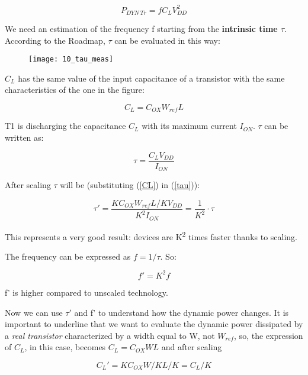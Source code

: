 \documentclass[a4paper, 12pt, twoside, openright]{report}
\newcommand{\super}{\textsuperscript}
\begin{document}
	\begin{equation}
	P_{DYN \ Tr} =f C_L V_{DD}^2
	\end{equation}

We need an estimation of the frequency f starting from the \textbf{intrinsic time $\tau$}. According to the Roadmap, $\tau$ can be evaluated in this way:

	\begin{figure}[H]
	\centering
	\texttt{[image: 10\_tau\_meas]}
	\caption{}
	\label{}
	\end{figure}

$C_{L}$ has the same value of the input capacitance of a transistor with the same characteristics of the one in the figure:

	\begin{equation}
	C_{L} = C_{OX} W_{ref} L
	\label{CL}
	\end{equation}

T1 is discharging the capacitance $C_{L}$ with its maximum current $I_{ON}$. $\tau$ can be written as:

	\begin{equation}
	\tau = \frac{C_L V_{DD}}{I_{ON}}
	\label{tau}
	\end{equation}

After scaling $\tau$ will be (substituting (\ref{CL}) in (\ref{tau})):

	\begin{equation}
	\tau ' = \frac{K C_{OX} W_{ref} L/K V_{DD}}{K^2 I_{ON}} = \frac{1}{K^2} \cdot \tau
	\end{equation}

This represents a very good result: devices are K\super{2} times faster thanks to scaling.

The frequency can be expressed as $f = 1/\tau$. So:

	\begin{equation}
	f' = K^2 f
	\end{equation}

f' is higher compared to unscaled technology.

Now we can use $\tau'$ and f' to understand how the dynamic power changes. It is important to underline that we want to evaluate the dynamic power dissipated by a \emph{real transistor} characterized by a width equal to W, not $W_{ref}$, so, the expression of $C_{L}$, in this case, becomes $C_L = C_{OX} W L$ and after scaling

	\begin{equation}
	C_L ' = K C_{OX} W/K L/K = C_L/K
	\end{equation}
\end{document}
